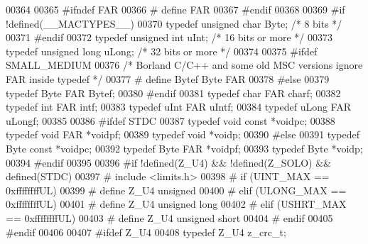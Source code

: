 \begin{DoxyCode}
00364 
00365 \textcolor{preprocessor}{#ifndef FAR}
00366 \textcolor{preprocessor}{#  define FAR}
00367 \textcolor{preprocessor}{#endif}
00368 
00369 \textcolor{preprocessor}{#if !defined(\_\_MACTYPES\_\_)}
00370 \textcolor{keyword}{typedef} \textcolor{keywordtype}{unsigned} \textcolor{keywordtype}{char}  Byte;  \textcolor{comment}{/* 8 bits */}
00371 \textcolor{preprocessor}{#endif}
00372 \textcolor{keyword}{typedef} \textcolor{keywordtype}{unsigned} \textcolor{keywordtype}{int}   uInt;  \textcolor{comment}{/* 16 bits or more */}
00373 \textcolor{keyword}{typedef} \textcolor{keywordtype}{unsigned} \textcolor{keywordtype}{long}  uLong; \textcolor{comment}{/* 32 bits or more */}
00374 
00375 \textcolor{preprocessor}{#ifdef SMALL\_MEDIUM}
00376    \textcolor{comment}{/* Borland C/C++ and some old MSC versions ignore FAR inside typedef */}
00377 \textcolor{preprocessor}{#  define Bytef Byte FAR}
00378 \textcolor{preprocessor}{#else}
00379    \textcolor{keyword}{typedef} Byte  FAR Bytef;
00380 \textcolor{preprocessor}{#endif}
00381 \textcolor{keyword}{typedef} \textcolor{keywordtype}{char}  FAR charf;
00382 \textcolor{keyword}{typedef} \textcolor{keywordtype}{int}   FAR intf;
00383 \textcolor{keyword}{typedef} uInt  FAR uIntf;
00384 \textcolor{keyword}{typedef} uLong FAR uLongf;
00385 
00386 \textcolor{preprocessor}{#ifdef STDC}
00387    \textcolor{keyword}{typedef} \textcolor{keywordtype}{void} \textcolor{keyword}{const} *voidpc;
00388    \textcolor{keyword}{typedef} \textcolor{keywordtype}{void} FAR   *voidpf;
00389    \textcolor{keyword}{typedef} \textcolor{keywordtype}{void}       *voidp;
00390 \textcolor{preprocessor}{#else}
00391    \textcolor{keyword}{typedef} Byte \textcolor{keyword}{const} *voidpc;
00392    \textcolor{keyword}{typedef} Byte FAR   *voidpf;
00393    \textcolor{keyword}{typedef} Byte       *voidp;
00394 \textcolor{preprocessor}{#endif}
00395 
00396 \textcolor{preprocessor}{#if !defined(Z\_U4) && !defined(Z\_SOLO) && defined(STDC)}
00397 \textcolor{preprocessor}{#  include <limits.h>}
00398 \textcolor{preprocessor}{#  if (UINT\_MAX == 0xffffffffUL)}
00399 \textcolor{preprocessor}{#    define Z\_U4 unsigned}
00400 \textcolor{preprocessor}{#  elif (ULONG\_MAX == 0xffffffffUL)}
00401 \textcolor{preprocessor}{#    define Z\_U4 unsigned long}
00402 \textcolor{preprocessor}{#  elif (USHRT\_MAX == 0xffffffffUL)}
00403 \textcolor{preprocessor}{#    define Z\_U4 unsigned short}
00404 \textcolor{preprocessor}{#  endif}
00405 \textcolor{preprocessor}{#endif}
00406 
00407 \textcolor{preprocessor}{#ifdef Z\_U4}
00408    \textcolor{keyword}{typedef} Z\_U4 z\_crc\_t;

\end{DoxyCode}
